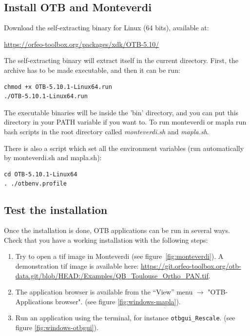 \documentclass[10pt,a4paper]{article}
\begin{document}
\subsection{Install OTB and Monteverdi}
Download the self-extracting binary for Linux (64 bits), available at:
\begin{center}
\url{https://orfeo-toolbox.org/packages/xdk/OTB-5.10/}
\end{center}

The self-extracting binary will extract itself in the current directory. First, the archive has to be made executable, and then it can be run:
\begin{verbatim}
chmod +x OTB-5.10.1-Linux64.run
./OTB-5.10.1-Linux64.run
\end{verbatim}

The executable binaries will be inside the 'bin' directory, and you can put this
directory in your PATH variable if you want to. To run monteverdi or mapla run
bash scripts in the root directory called \textit{monteverdi.sh} and \textit{mapla.sh}.

There is also a script which set all the environment variables (run
automatically by monteverdi.sh and mapla.sh):

\begin{verbatim}
cd OTB-5.10.1-Linux64
. ./otbenv.profile
\end{verbatim}

\subsection{Test the installation}
Once the installation is done, OTB applications can be run in several ways. Check that you have a working installation with the following steps:
\begin{enumerate}

\item Try to open a tif image in Monteverdi (see
figure~\ref{fig:monteverdi}). A demonstration tif image is available here: \url{https://git.orfeo-toolbox.org/otb-data.git/blob/HEAD:/Examples/QB\_Toulouse\_Ortho\_PAN.tif}.

\item The application browser is available from the ``View'' menu 
$\rightarrow$ "OTB-Applications browser".
(see figure \ref{fig:windows-mapla}).

\item Run an application using the terminal, for instance
\texttt{otbgui\_Rescale}. (see figure \ref{fig:windows-otbgui}).

\end{enumerate}
\end{document}
